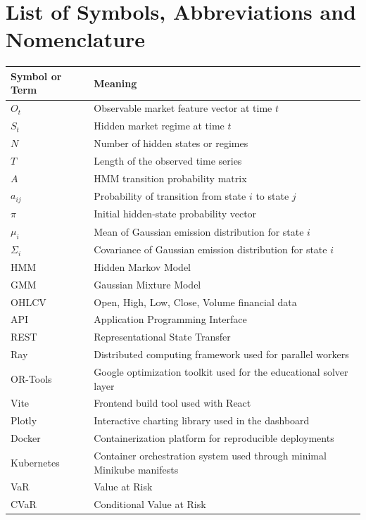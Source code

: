 \documentclass[12pt,a4paper]{report}
\begin{document}
\chapter*{List of Symbols, Abbreviations and Nomenclature}
\begin{longtable}{p{}p{}}
\toprule
\textbf{Symbol or Term} & \textbf{Meaning} \\
\midrule
$O_t$ & Observable market feature vector at time $t$ \\
$S_t$ & Hidden market regime at time $t$ \\
$N$ & Number of hidden states or regimes \\
$T$ & Length of the observed time series \\
$A$ & HMM transition probability matrix \\
$a_{ij}$ & Probability of transition from state $i$ to state $j$ \\
$\pi$ & Initial hidden-state probability vector \\
$\mu_i$ & Mean of Gaussian emission distribution for state $i$ \\
$\Sigma_i$ & Covariance of Gaussian emission distribution for state $i$ \\
HMM & Hidden Markov Model \\
GMM & Gaussian Mixture Model \\
OHLCV & Open, High, Low, Close, Volume financial data \\
API & Application Programming Interface \\
REST & Representational State Transfer \\
Ray & Distributed computing framework used for parallel workers \\
OR-Tools & Google optimization toolkit used for the educational solver layer \\
Vite & Frontend build tool used with React \\
Plotly & Interactive charting library used in the dashboard \\
Docker & Containerization platform for reproducible deployments \\
Kubernetes & Container orchestration system used through minimal Minikube manifests \\
VaR & Value at Risk \\
CVaR & Conditional Value at Risk \\
\bottomrule
\end{longtable}
\end{document}
